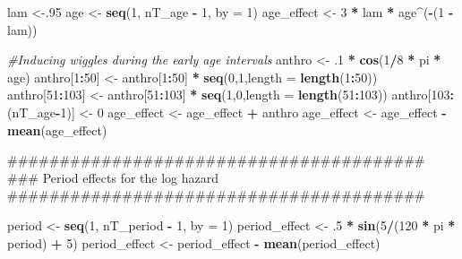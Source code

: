 \documentclass[11pt,]{article}
\newenvironment{Shaded}{\begin{snugshade}}{\end{snugshade}}
\newcommand{\KeywordTok}[1]{\textcolor[rgb]{0.13,0.29,0.53}{\textbf{#1}}}
\newcommand{\DataTypeTok}[1]{\textcolor[rgb]{0.13,0.29,0.53}{#1}}
\newcommand{\DecValTok}[1]{\textcolor[rgb]{0.00,0.00,0.81}{#1}}
\newcommand{\StringTok}[1]{\textcolor[rgb]{0.31,0.60,0.02}{#1}}
\newcommand{\CommentTok}[1]{\textcolor[rgb]{0.56,0.35,0.01}{\textit{#1}}}
\newcommand{\OperatorTok}[1]{\textcolor[rgb]{0.81,0.36,0.00}{\textbf{#1}}}
\newcommand{\NormalTok}[1]{#1}
\begin{document}
\begin{Shaded}
\begin{Highlighting}[]
\NormalTok{  lam <-.}\DecValTok{95}
\NormalTok{  age <-}\StringTok{ }\KeywordTok{seq}\NormalTok{(}\DecValTok{1}\NormalTok{, nT_age }\OperatorTok{-}\StringTok{ }\DecValTok{1}\NormalTok{, }\DataTypeTok{by =} \DecValTok{1}\NormalTok{) }
\NormalTok{  age_effect <-}\StringTok{ }\DecValTok{3} \OperatorTok{*}\StringTok{ }\NormalTok{lam }\OperatorTok{*}\StringTok{ }\NormalTok{age}\OperatorTok{^}\NormalTok{(}\OperatorTok{-}\NormalTok{(}\DecValTok{1} \OperatorTok{-}\StringTok{ }\NormalTok{lam))}

  \CommentTok{#Inducing wiggles during the early age intervals}
\NormalTok{  anthro <-}\StringTok{ }\NormalTok{.}\DecValTok{1} \OperatorTok{*}\StringTok{ }\KeywordTok{cos}\NormalTok{(}\DecValTok{1}\OperatorTok{/}\DecValTok{8} \OperatorTok{*}\StringTok{ }\NormalTok{pi }\OperatorTok{*}\StringTok{ }\NormalTok{age)}
\NormalTok{  anthro[}\DecValTok{1}\OperatorTok{:}\DecValTok{50}\NormalTok{] <-}\StringTok{ }\NormalTok{anthro[}\DecValTok{1}\OperatorTok{:}\DecValTok{50}\NormalTok{] }\OperatorTok{*}\StringTok{ }\KeywordTok{seq}\NormalTok{(}\DecValTok{0}\NormalTok{,}\DecValTok{1}\NormalTok{,}\DataTypeTok{length =} \KeywordTok{length}\NormalTok{(}\DecValTok{1}\OperatorTok{:}\DecValTok{50}\NormalTok{))}
\NormalTok{  anthro[}\DecValTok{51}\OperatorTok{:}\DecValTok{103}\NormalTok{] <-}\StringTok{ }\NormalTok{anthro[}\DecValTok{51}\OperatorTok{:}\DecValTok{103}\NormalTok{] }\OperatorTok{*}\StringTok{ }\KeywordTok{seq}\NormalTok{(}\DecValTok{1}\NormalTok{,}\DecValTok{0}\NormalTok{,}\DataTypeTok{length =} \KeywordTok{length}\NormalTok{(}\DecValTok{51}\OperatorTok{:}\DecValTok{103}\NormalTok{))}
\NormalTok{  anthro[}\DecValTok{103}\OperatorTok{:}\NormalTok{(nT_age}\OperatorTok{-}\DecValTok{1}\NormalTok{)] <-}\StringTok{ }\DecValTok{0}
\NormalTok{  age_effect <-}\StringTok{ }\NormalTok{age_effect }\OperatorTok{+}\StringTok{ }\NormalTok{anthro}
\NormalTok{  age_effect <-}\StringTok{ }\NormalTok{age_effect }\OperatorTok{-}\StringTok{ }\KeywordTok{mean}\NormalTok{(age_effect)}


\NormalTok{  ########################################}
\NormalTok{  ### Period effects for the log hazard}
\NormalTok{  ########################################}

\NormalTok{  period <-}\StringTok{ }\KeywordTok{seq}\NormalTok{(}\DecValTok{1}\NormalTok{, nT_period }\OperatorTok{-}\StringTok{ }\DecValTok{1}\NormalTok{, }\DataTypeTok{by =} \DecValTok{1}\NormalTok{)}
\NormalTok{  period_effect <-}\StringTok{ }\NormalTok{.}\DecValTok{5} \OperatorTok{*}\StringTok{ }\KeywordTok{sin}\NormalTok{(}\DecValTok{5}\OperatorTok{/}\NormalTok{(}\DecValTok{120} \OperatorTok{*}\StringTok{ }\NormalTok{pi }\OperatorTok{*}\StringTok{ }\NormalTok{period) }\OperatorTok{+}\StringTok{ }\DecValTok{5}\NormalTok{)}
\NormalTok{  period_effect <-}\StringTok{ }\NormalTok{period_effect }\OperatorTok{-}\StringTok{ }\KeywordTok{mean}\NormalTok{(period_effect)}



\end{Highlighting}
\end{Shaded}
\end{document}
